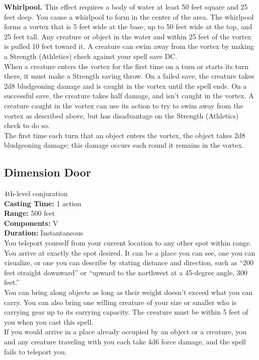 \documentclass[11pt, A4paper, english]{article}
\begin{document}
\textbf{Whirlpool.} This effect requires a body of water at least 50 feet square and 25 feet deep. You cause a whirlpool to form in the center of the area. The whirlpool forms a vortex that is 5 feet wide at the base, up to 50 feet wide at the top, and 25 feet tall. Any creature or object in the water and within 25 feet of the vortex is pulled 10 feet toward it. A creature can swim away from the vortex by making a Strength (Athletics) check against your spell save DC. \\
When a creature enters the vortex for the first time on a turn or starts its turn there, it must make a Strength saving throw. On a failed save, the creature takes 2d8 bludgeoning damage and is caught in the vortex until the spell ends. On a successful save, the creature takes half damage, and isn’t caught in the vortex. A creature caught in the vortex can use its action to try to swim away from the vortex as described above, but has disadvantage on the Strength (Athletics) check to do so. \\
The first time each turn that an object enters the vortex, the object takes 2d8 bludgeoning damage; this damage occurs each round it remains in the vortex.

		\subsection{Dimension Door}
4th-level conjuration \\
\textbf{Casting Time:} 1 action \\
\textbf{Range:} 500 feet \\
\textbf{Components:} V \\
\textbf{Duration:} Instantaneous \\
You teleport yourself from your current location to any other spot within range. You arrive at exactly the spot desired. It can be a place you can see, one you can visualize, or one you can describe by stating distance and direction, such as “200 feet straight downward” or “upward to the northwest at a 45-degree angle, 300 feet.” \\
You can bring along objects as long as their weight doesn’t exceed what you can carry. You can also bring one willing creature of your size or smaller who is carrying gear up to its carrying capacity. The creature must be within 5 feet of you when you cast this spell. \\
If you would arrive in a place already occupied by an object or a creature, you and any creature traveling with you each take 4d6 force damage, and the spell fails to teleport you.
\end{document}

